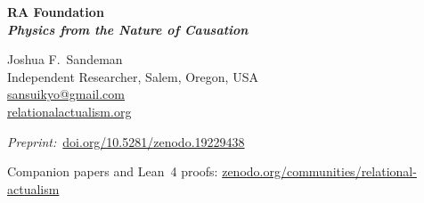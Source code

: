 \documentclass[11pt,a4paper]{article}
\begin{document}
\begin{titlepage}
\centering
\vspace*{1.5cm}

{\LARGE\bfseries RA Foundation\\[0.5em]
\large\itshape Physics from the Nature of Causation\par}

\vspace{1.4cm}

{\large Joshua F.\ Sandeman\\[0.3em]
\normalsize Independent Researcher, Salem, Oregon, USA\\[0.2em]
\href{mailto:sansuikyo@gmail.com}{sansuikyo@gmail.com}\\[0.4em]
\href{https://relationalactualism.org}{relationalactualism.org}}

\vspace{0.8cm}
{\small\textit{Preprint:}~\href{https://doi.org/10.5281/zenodo.19229438}{doi.org/10.5281/zenodo.19229438}\par}
  {\small Companion papers and Lean~4 proofs:
  \href{https://zenodo.org/communities/relational-actualism}%
  {zenodo.org/communities/relational-actualism}\par}

\vspace{1.4cm}


\end{titlepage}
\end{document}
